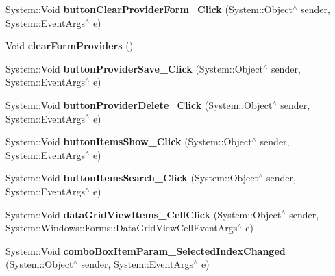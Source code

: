 \begin{DoxyCompactItemize}
\item 
\hypertarget{class_magazyn_1_1_magazin_aa289ab59d38376ffbbf5f9286aedc8a2}{}\label{class_magazyn_1_1_magazin_aa289ab59d38376ffbbf5f9286aedc8a2} 
System\+::\+Void {\bfseries button\+Clear\+Provider\+Form\+\_\+\+Click} (System\+::\+Object$^\wedge$ sender, System\+::\+Event\+Args$^\wedge$ e)
\item 
\hypertarget{class_magazyn_1_1_magazin_af1f8f28a803fa1dfc5820c89501a93ae}{}\label{class_magazyn_1_1_magazin_af1f8f28a803fa1dfc5820c89501a93ae} 
Void {\bfseries clear\+Form\+Providers} ()
\item 
\hypertarget{class_magazyn_1_1_magazin_a1b33449d6353faf2ffca5ebb45a26d77}{}\label{class_magazyn_1_1_magazin_a1b33449d6353faf2ffca5ebb45a26d77} 
System\+::\+Void {\bfseries button\+Provider\+Save\+\_\+\+Click} (System\+::\+Object$^\wedge$ sender, System\+::\+Event\+Args$^\wedge$ e)
\item 
\hypertarget{class_magazyn_1_1_magazin_a121869cc605287e6d13f8767e1951512}{}\label{class_magazyn_1_1_magazin_a121869cc605287e6d13f8767e1951512} 
System\+::\+Void {\bfseries button\+Provider\+Delete\+\_\+\+Click} (System\+::\+Object$^\wedge$ sender, System\+::\+Event\+Args$^\wedge$ e)
\item 
\hypertarget{class_magazyn_1_1_magazin_af8d814868f0b91db7ec19b7c65a9458d}{}\label{class_magazyn_1_1_magazin_af8d814868f0b91db7ec19b7c65a9458d} 
System\+::\+Void {\bfseries button\+Items\+Show\+\_\+\+Click} (System\+::\+Object$^\wedge$ sender, System\+::\+Event\+Args$^\wedge$ e)
\item 
\hypertarget{class_magazyn_1_1_magazin_aeedf3f5f79926aaf9a5287e588806419}{}\label{class_magazyn_1_1_magazin_aeedf3f5f79926aaf9a5287e588806419} 
System\+::\+Void {\bfseries button\+Items\+Search\+\_\+\+Click} (System\+::\+Object$^\wedge$ sender, System\+::\+Event\+Args$^\wedge$ e)
\item 
\hypertarget{class_magazyn_1_1_magazin_a9976f63514d0e56c82c9a36a386df804}{}\label{class_magazyn_1_1_magazin_a9976f63514d0e56c82c9a36a386df804} 
System\+::\+Void {\bfseries data\+Grid\+View\+Items\+\_\+\+Cell\+Click} (System\+::\+Object$^\wedge$ sender, System\+::\+Windows\+::\+Forms\+::\+Data\+Grid\+View\+Cell\+Event\+Args$^\wedge$ e)
\item 
\hypertarget{class_magazyn_1_1_magazin_a4952a20bc553e0b94949f779bd4d6d5c}{}\label{class_magazyn_1_1_magazin_a4952a20bc553e0b94949f779bd4d6d5c} 
System\+::\+Void {\bfseries combo\+Box\+Item\+Param\+\_\+\+Selected\+Index\+Changed} (System\+::\+Object$^\wedge$ sender, System\+::\+Event\+Args$^\wedge$ e)

\end{DoxyCompactItemize}
